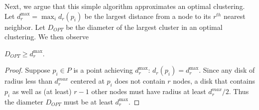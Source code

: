 

Next, we argue that this simple algorithm approximates an optimal clustering. Let $d_{r}^{\max} = \max_{i}{d_{r}(p_{i})}$ be the largest distance from a node to its $r^{th}$ nearest neighbor. Let $D_{OPT}$ be the diameter of the largest cluster in an optimal clustering.  We then observe

\begin{observation}
$D_{OPT}\geq d_{r}^{\max}$.
\label{obs:lower-bound}
\end{observation}
\begin{proof}
Suppose $p_{i}\in P$ is a point achieving $d_{r}^{\max}$: $d_{r}(p_{i}) = d_{r}^{\max}$. Since any disk of radius less than $d_{r}^{max}$ centered at $p_{i}$ does not contain $r$ nodes, a disk that contains $p_{i}$ as well as (at least) $r-1$ other nodes must have radius at least $d_{r}^{max}/2$. Thus the diameter $D_{OPT}$ must be at least $d_{r}^{\max}$.
\end{proof}

